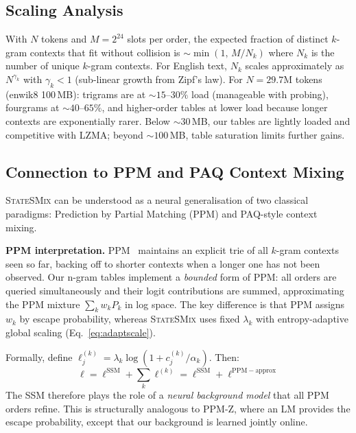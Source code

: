 \documentclass[10pt,twocolumn]{article}
\newcommand{\ssmcomp}{\textsc{StateSMix}}
\begin{document}
\subsection{Scaling Analysis}

With $N$ tokens and $M=2^{24}$ slots per order, the expected
fraction of distinct $k$-gram contexts that fit without collision
is ${\sim}\min(1,\,M/N_k)$ where $N_k$ is the number of unique
$k$-gram contexts.  For English text, $N_k$ scales approximately
as $N^{\gamma_k}$ with $\gamma_k < 1$ (sub-linear growth from
Zipf's law).  For $N=29.7\text{M}$ tokens (enwik8 100\,MB):
trigrams are at ${\sim}15$--$30\%$ load (manageable with probing),
fourgrams at ${\sim}40$--$65\%$, and higher-order tables at lower
load because longer contexts are exponentially rarer.  Below ${\sim}30$\,MB,
our tables are lightly loaded and competitive with LZMA; beyond
${\sim}100$\,MB, table saturation limits further gains.

\subsection{Connection to PPM and PAQ Context Mixing}
\label{sec:ppm}

\ssmcomp{} can be understood as a neural generalisation of two
classical paradigms: Prediction by Partial Matching (PPM) and PAQ-style
context mixing.

\textbf{PPM interpretation.}
PPM~\citep{cleary1984} maintains an explicit trie of all $k$-gram
contexts seen so far, backing off to shorter contexts when a longer
one has not been observed.  Our n-gram tables implement a \emph{bounded}
form of PPM: all orders are queried simultaneously and their logit
contributions are summed, approximating the PPM mixture $\sum_k w_k P_k$
in log space.  The key difference is that PPM assigns $w_k$ by escape
probability, whereas \ssmcomp{} uses fixed $\lambda_k$ with entropy-adaptive
global scaling (Eq.~\ref{eq:adaptscale}).

Formally, define $\ell^{(k)}_j = \lambda_k \log(1+c^{(k)}_j/\alpha_k)$.
Then:
\begin{equation}
  \boldsymbol{\ell} = \boldsymbol{\ell}^\mathrm{SSM}
    + \sum_k \boldsymbol{\ell}^{(k)}
  = \boldsymbol{\ell}^\mathrm{SSM}
    + \boldsymbol{\ell}^\mathrm{PPM-approx}
\end{equation}
The SSM therefore plays the role of a \emph{neural background model}
that all PPM orders refine.  This is structurally analogous to PPM-Z,
where an LM provides the escape probability, except that our
background is learned jointly online.
\end{document}
